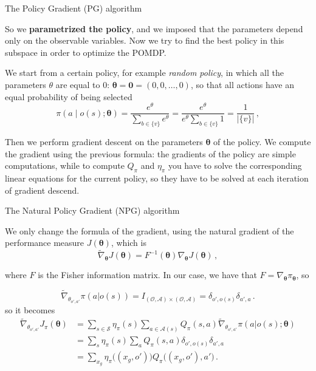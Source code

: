 \documentclass[10pt, aspectratio=169, compress, protectframetitle, handout]{beamer}
\begin{document}
\begin{frame}{The Policy Gradient (PG) algorithm}

    So we \textbf{parametrized the policy}, and we imposed that the parameters depend only on the observable variables. Now we try to find the best policy in this subspace in order to optimize the POMDP.
    
    \alert{We start from a certain policy}, for example \emph{random policy}, in which all the parameters $\theta$ are equal to $0$: $\boldsymbol \theta = \mathbf 0 = (0, 0, \ldots, 0)$, so that all actions have an equal probability of being selected
    \begin{equation*}
        \pi \left( a \;\big|\; o(s); \boldsymbol \theta \right) = \frac{e^{\theta}}{\sum_{b \in \{v\}} e^{\theta}} = \frac{e^{\theta}}{e^{\theta} \sum_{b \in \{v\}} 1 } = \frac1{ |\{v\}| } \, ,
    \end{equation*}
    
    Then we \alert{perform gradient descent on the parameters $\boldsymbol \theta$ of the policy}. We compute the gradient using the previous formula: the gradients of the policy are simple computations, while to compute $Q_\pi$ and $\eta_\pi$ you have to solve the corresponding linear equations for the current policy, so they \alert{have to be solved at each iteration of gradient descend}.
    
\end{frame}

\begin{frame}{The Natural Policy Gradient (NPG) algorithm}

    We only change the formula of the gradient, using the \alert{natural gradient} of the performance measure $J(\boldsymbol \theta)$, which is
    \begin{equation*}
        \widetilde \nabla_{\boldsymbol \theta} J(\boldsymbol \theta) = F^{-1}(\boldsymbol \theta) \nabla_{\boldsymbol \theta} J(\boldsymbol \theta) \, ,
    \end{equation*}
    
    where $F$ is the \alert{Fisher information matrix}. In our case, we have that $F = \nabla_{\boldsymbol \theta} \pi_{\boldsymbol \theta}$, so
    
    \begin{equation*}
        \widetilde \nabla_{\theta_{o',a'}} \pi(a|o(s)) = I_{(\mathcal O, \mathcal A) \times (\mathcal O, \mathcal A)} = \delta_{o', o(s)} \delta_{a',a} \, .
    \end{equation*}
    so it becomes
    \begin{align*}
        \widetilde \nabla_{\theta_{o',a'}} J_\pi (\boldsymbol \theta)
        &= \sum_{s \in \mathcal S} \eta_\pi(s) \sum_{a \in \mathcal A(s)} Q_\pi(s,a) \widetilde \nabla_{\theta_{o',a'}} \pi(a|o(s); \boldsymbol \theta) \\
        &= \sum_s \eta_\pi(s) \sum_a Q_\pi(s,a) \delta_{o', o(s)} \delta_{a',a} \\
        &= \sum_{x_g} \eta_\pi \big((x_g, o') \big) Q_\pi \big((x_g, o'), a' \big)\, .
    \end{align*}

\end{frame}
\end{document}
